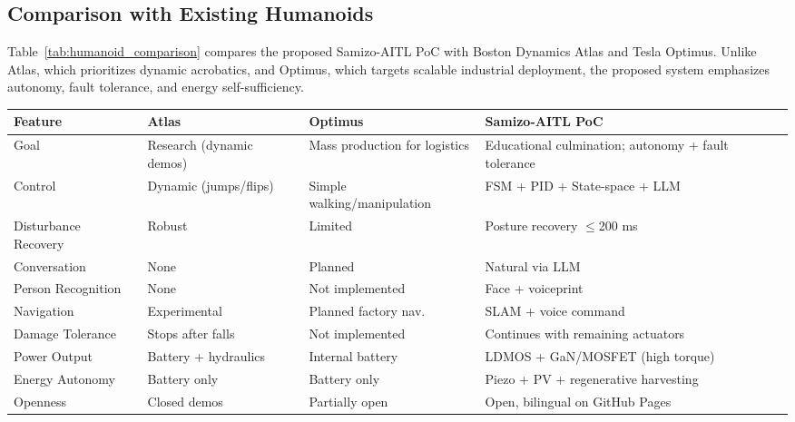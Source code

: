 \subsection{Comparison with Existing Humanoids}
Table~\ref{tab:humanoid_comparison} compares the proposed Samizo-AITL PoC 
with Boston Dynamics Atlas and Tesla Optimus.
Unlike Atlas, which prioritizes dynamic acrobatics,
and Optimus, which targets scalable industrial deployment,
the proposed system emphasizes autonomy, fault tolerance,
and energy self-sufficiency.

\begin{table*}[t]
\caption{Comparison of World-Leading Humanoid Robots}
\label{tab:humanoid_comparison}
\centering
\renewcommand{\arraystretch}{1.2}
\footnotesize
\begin{tabular}{p{2.5cm} p{2.5cm} p{2.5cm} p{6.5cm}}
\toprule
\textbf{Feature} & \textbf{Atlas} & \textbf{Optimus} & \textbf{Samizo-AITL PoC} \\
\midrule
Goal & Research (dynamic demos) & Mass production for logistics & Educational culmination; autonomy + fault tolerance \\
Control & Dynamic (jumps/flips) & Simple walking/manipulation & FSM + PID + State-space + LLM \\
Disturbance Recovery & Robust & Limited & Posture recovery $\leq$200 ms \\
Conversation & None & Planned & Natural via LLM \\
Person Recognition & None & Not implemented & Face + voiceprint \\
Navigation & Experimental & Planned factory nav. & SLAM + voice command \\
Damage Tolerance & Stops after falls & Not implemented & Continues with remaining actuators \\
Power Output & Battery + hydraulics & Internal battery & LDMOS + GaN/MOSFET (high torque) \\
Energy Autonomy & Battery only & Battery only & Piezo + PV + regenerative harvesting \\
Openness & Closed demos & Partially open & Open, bilingual on GitHub Pages \\
\bottomrule
\end{tabular}
\end{table*}

